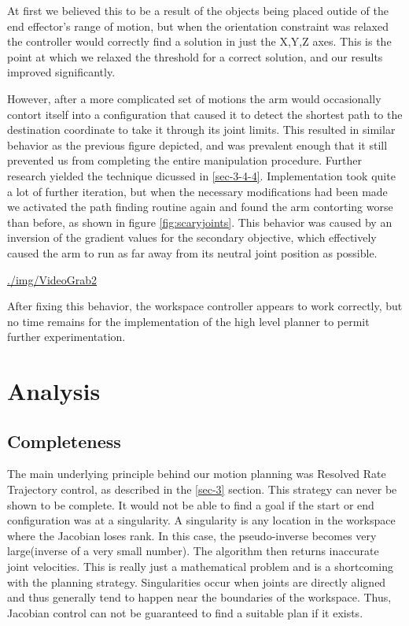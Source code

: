 \documentclass[10pt, conference]{IEEEtran}
\begin{document}
  At first we believed this to be a result of the objects being placed
  outide of the end effector's range of motion, but when the orientation
  constraint was relaxed the controller would correctly find a solution
  in just the X,Y,Z axes. This is the point at which we relaxed the
  threshold for a correct solution, and our results improved
  significantly.

  However, after a more complicated set of motions the arm would
  occasionally contort itself into a configuration that caused it to
  detect the shortest path to the destination coordinate to take it
  through its joint limits. This resulted in similar behavior as the
  previous figure depicted, and was prevalent enough that it still
  prevented us from completing the entire manipulation
  procedure. Further research yielded the technique dicussed in \ref{sec-3-4-4}. Implementation took quite a lot of further iteration,
  but when the necessary modifications had been made we activated the
  path finding routine again and found the arm contorting worse than
  before, as shown in figure \ref{fig:scaryjoints}. This behavior was
  caused by an inversion of the gradient values for the secondary
  objective, which effectively caused the arm to run as far away from
  its neutral joint position as possible.

  \href{file://../img/VideoGrab2}{./img/VideoGrab2}

  After fixing this behavior, the workspace controller appears to work
  correctly, but no time remains for the implementation of the high
  level planner to permit further experimentation.
\section{Analysis}
\label{sec-5}
\subsection{Completeness}
\label{sec-5-1}

   The main underlying principle behind our motion planning was
   Resolved Rate Trajectory control, as described in the \ref{sec-3}
   section.  This strategy can never be shown to be complete. It would
   not be able to find a goal if the start or end configuration was at
   a singularity. A singularity is any location in the workspace where
   the Jacobian loses rank. In this case, the pseudo-inverse becomes
   very large(inverse of a very small number). The algorithm then
   returns inaccurate joint velocities. This is really just a
   mathematical problem and is a shortcoming with the planning
   strategy. Singularities occur when joints are directly aligned and
   thus generally tend to happen near the boundaries of the
   workspace. Thus, Jacobian control can not be guaranteed to find a
   suitable plan if it exists.
\end{document}
